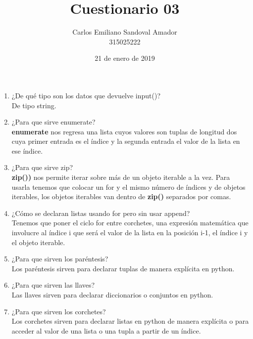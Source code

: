 \documentclass[letterpaper, 12pt, oneside]{article}%
\title{Cuestionario 03}
\author{Carlos Emiliano Sandoval Amador \\ 315025222}
\date{21 de enero de 2019}
\begin{document}
	\maketitle
	\begin{enumerate} %
		\item ¿De qué tipo son los datos que devuelve input()? \\ De tipo string.
		\item ¿Para que sirve enumerate? \\  \textbf{enumerate} nos regresa una lista cuyos valores son tuplas de longitud dos cuya primer entrada es el índice y la segunda entrada el valor de la lista en ese índice.
		\item ¿Para que sirve zip? \\ 	 \textbf{zip())} nos permite iterar sobre más de un objeto iterable a la vez. Para usarla tenemos que colocar un for y el mismo número de índices y de objetos iterables, los objetos iterables van dentro de \textbf{zip()} separados por comas.
		\item ¿Cómo se declaran listas usando for pero sin usar append? \\ Tenemos que poner el ciclo for entre corchetes, una expresión matemática que involucre al índice i que será el valor de la lista en la posición i-1, el índice i y el objeto iterable. 
		\item ¿Para que sirven los paréntesis? \\ Los paréntesis sirven para declarar tuplas de manera explícita en python.
		\item ¿Para que sirven las llaves? \\ Las llaves sirven para declarar diccionarios o conjuntos en python.
		\item ¿Para que sirven los corchetes? \\ Los corchetes sirven para declarar listas en python de manera explícita o para acceder al valor de una lista o una tupla a partir de un índice.
	\end{enumerate}
\end{document}
